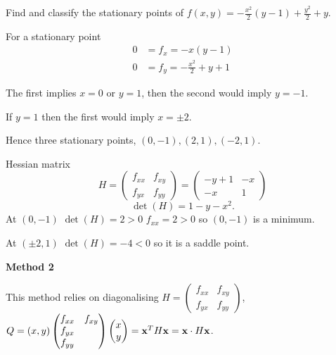 \documentclass[10pt, a4paper]{article}
\begin{document}
\begin{example}
    Find and classify the stationary points of $f(x, y) = -\frac{x ^ 2}{2}(y - 1) + \frac{y ^ 2}{2} + y$.

    \begin{solution}
        For a stationary point
        \begin{align*}
            0 &= f_x = -x(y - 1) \\
            0 &= f_y = -\frac{x ^ 2}{2} + y + 1
        \end{align*}

        The first implies $x = 0$ or $y = 1$,
        then the second would imply $y = -1$.

        If $y = 1$ then the first would imply $x = \pm 2$.

        Hence three stationary points,
        $(0, -1), (2, 1), (-2, 1)$.

        Hessian matrix
        \[
        H = \begin{pmatrix}
            f_{xx} & f_{xy} \\
            f_{yx} & f_{yy}
        \end{pmatrix}
        = \begin{pmatrix}
            -y + 1 & -x \\
            -x & 1
        \end{pmatrix}
        \]
        \[
        \det(H) = 1 - y - x ^ 2.
        \]
        At $(0, -1)$ $\det(H) = 2 > 0$ $f_{xx} = 2 > 0$ so $(0, -1)$ is a minimum.

        At $(\pm 2, 1)$ $\det(H) = -4 < 0$ so it is a saddle point.
    \end{solution}
\end{example}

\textbf{Method 2}

This method relies on diagonalising $H = \begin{pmatrix}
    f_{xx} & f_{xy} \\
    f_{yx} & f_{yy}
\end{pmatrix}$,
$Q = (x, y)\begin{pmatrix}
    f_{xx} & f_{xy} \\
    f_{yx} \\ f_{yy}
\end{pmatrix}\begin{pmatrix}
    x \\ y
\end{pmatrix} = \mathbf{x} ^ TH\mathbf{x} = \mathbf{x} \cdot H\mathbf{x}$.
\end{document}
